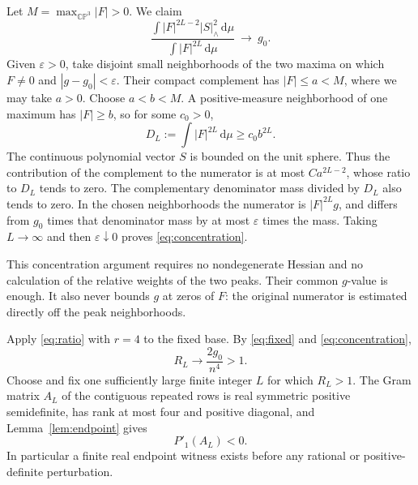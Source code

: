 \documentclass[11pt]{article}
\theoremstyle{remark}
\newcommand{\CP}{\mathbb{CP}}
\newcommand{\normW}[1]{\lvert #1\rvert_{\wedge}}
\newcommand{\dd}{\,\mathrm d}
\begin{document}
Let $M=\max_{\CP^3}|F|>0$. We claim
\begin{equation}\label{eq:concentration}
 \frac{\int |F|^{2L-2}\normW{S}^2\dd\mu}
      {\int |F|^{2L}\dd\mu}\ \longrightarrow\ g_0.
\end{equation}
Given $\varepsilon>0$, take disjoint small neighborhoods of the two maxima on which $F\ne0$ and $|g-g_0|<\varepsilon$. Their compact complement has $|F|\leq a<M$, where we may take $a>0$. Choose $a<b<M$. A positive-measure neighborhood of one maximum has $|F|\geq b$, so for some $c_0>0$,
\[
 D_L:=\int |F|^{2L}\dd\mu\geq c_0b^{2L}.
\]
The continuous polynomial vector $S$ is bounded on the unit sphere. Thus the contribution of the complement to the numerator is at most $C a^{2L-2}$, whose ratio to $D_L$ tends to zero. The complementary denominator mass divided by $D_L$ also tends to zero. In the chosen neighborhoods the numerator is $|F|^{2L}g$, and differs from $g_0$ times that denominator mass by at most $\varepsilon$ times the mass. Taking $L\to\infty$ and then $\varepsilon\downarrow0$ proves \eqref{eq:concentration}.

This concentration argument requires no nondegenerate Hessian and no calculation of the relative weights of the two peaks. Their common $g$-value is enough. It also never bounds $g$ at zeros of $F$: the original numerator is estimated directly off the peak neighborhoods.

Apply \eqref{eq:ratio} with $r=4$ to the fixed base. By \eqref{eq:fixed} and \eqref{eq:concentration},
\[
 R_L\longrightarrow\frac{2g_0}{n^4}>1.
\]
Choose and fix one sufficiently large finite integer $L$ for which $R_L>1$. The Gram matrix $A_L$ of the contiguous repeated rows is real symmetric positive semidefinite, has rank at most four and positive diagonal, and Lemma~\ref{lem:endpoint} gives
\begin{equation}\label{eq:negative}
 P'_1(A_L)<0.
\end{equation}
In particular a finite real endpoint witness exists before any rational or positive-definite perturbation.
\end{document}
